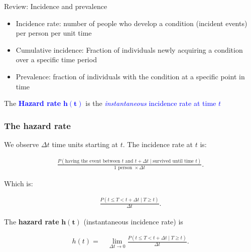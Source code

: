 \documentclass[10pt,t]{beamer}
\begin{document}
\begin{frame}{Review: Incidence and prevalence}
	\begin{itemize}
		\item Incidence rate: number of people who develop a condition (incident events) per person per unit time
		
		\medskip
		
		\item Cumulative incidence: Fraction of individuals newly acquiring a condition over a specific time period
		
		\medskip
		
		\item Prevalence: fraction of individuals with the condition at a specific point in time
	\end{itemize}
\bigskip

	The \textcolor{blue}{\textbf{Hazard rate} $\mathbf{h(t)}$} is the \textcolor{blue}{\textit{instantaneous} incidence rate at time $t$}
\end{frame}


\begin{frame}
\frametitle{The hazard rate}

\vspace{-5 mm}

We observe $\Delta t$ time units starting at $t$. The incidence rate at $t$ is:
\smallskip
\color{blue}

\begin{align*}
 \frac{P(\text{having the event between }t\text{ and }t+\Delta t \mid \text{survived until time }t )}{1\text{ person }\times\Delta t}.
\end{align*}

\medskip
\color{black}


Which is:
\smallskip

\color{blue}
\begin{align*}
\frac{P(t \leq T < t + \Delta t \mid T \geq t)}{\Delta t}.
\end{align*}

\medskip

\color{black}

The \textbf{hazard rate} $\mathbf{h(t)}$ (instantaneous incidence rate) is

\smallskip
\color{blue}
\begin{align*}
h(t) = & \ \lim_{\Delta t \to 0} \frac{P(t \leq T < t + \Delta t \mid T \geq t)}{\Delta t}.
\end{align*} 

\end{frame}
 
\end{document}
